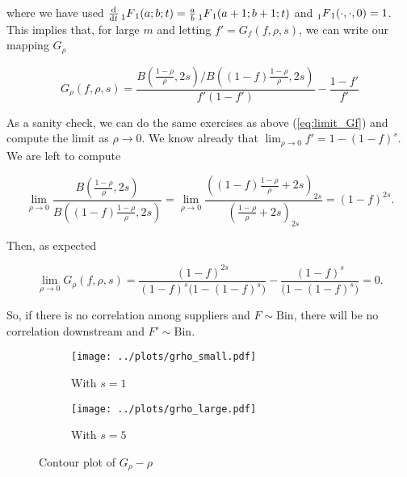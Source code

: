 \documentclass[american, abstract=on]{scrartcl}
\theoremstyle{plain}
\newcommand{\Bin}{\text{Bin}}
\begin{document}
where we have used $\frac{\text{d}}{\text{d}t} \prescript{}{1}{F}_1(a; b; t) = \frac{a}{b} \prescript{}{1}{F}_1(a + 1; b + 1; t)$ and $\prescript{}{1}{F}_1(\cdot, \cdot, 0) = 1$. This implies that, for large $m$ and letting $f' = G_f(f, \rho, s)$, we can write our mapping $G_{\rho}$


\begin{equation}
    G_{\rho}(f, \rho, s) = \frac{ B\left(\frac{1 - \rho}{\rho}, 2s \right) \Big/ B\left((1 - f) \frac{1 - \rho}{\rho}, 2s \right)}{f' (1 - f')} - \frac{1 - f'}{f'}
\end{equation}

As a sanity check, we can do the same exercises as above (\ref{eq:limit_Gf}) and compute the limit as $\rho \rightarrow 0$. We know already that $\lim_{\rho \rightarrow 0} f' = 1 - (1 - f)^s$. We are left to compute

\begin{equation}
    \lim_{\rho \rightarrow 0} \frac{B\left(\frac{1 - \rho}{\rho}, 2s \right)}{B\left((1 - f) \frac{1 - \rho}{\rho}, 2s \right)} = \lim_{\rho \rightarrow 0} \frac{\left((1-f)\frac{1 - \rho}{\rho} + 2s\right)_{2s}}{\left(\frac{1 - \rho}{\rho} + 2s\right)_{2s}} = (1 - f)^{2s}.
\end{equation}

Then, as expected

\begin{equation}
    \lim_{\rho \rightarrow 0} G_{\rho}(f, \rho, s) = \frac{(1-f)^{2s}}{(1 - f)^s \big(1 - (1 - f)^s\big)} - \frac{(1 - f)^s}{\big(1 - (1 - f)^s\big)} = 0.
\end{equation}

So, if there is no correlation among suppliers and $F \sim \Bin$, there will be no correlation downstream and $F' \sim \Bin$.

\begin{figure}[H]
    \centering
    \begin{subfigure}{.5\textwidth}
      \centering
      \texttt{[image: ../plots/grho\_small.pdf]} 
      \caption{With $s = 1$}
      \label{fig:grho:small}  
    \end{subfigure}%
    \begin{subfigure}{.5\textwidth}
      \centering
      \texttt{[image: ../plots/grho\_large.pdf]}       
      \caption{With $s = 5$}
      \label{fig:grho:large}
    \end{subfigure}
    \caption{Contour plot of $G_\rho - \rho$}
    \label{fig:grho}
  \end{figure}
\end{document}
